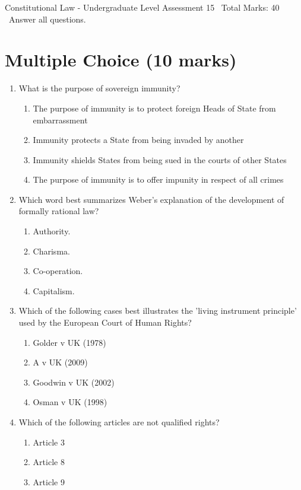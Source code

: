 \documentclass[12pt]{article}
\begin{document}
\begin{center}
Constitutional Law - Undergraduate Level Assessment 15 \
Total Marks: 40 \
Answer all questions.
\end{center}

\section*{Multiple Choice (10 marks)}
\begin{enumerate}[label=\arabic*.]
\item What is the purpose of sovereign immunity?
\begin{enumerate}[label=(\alph*)]
    \item The purpose of immunity is to protect foreign Heads of State from embarrassment
    \item Immunity protects a State from being invaded by another
    \item Immunity shields States from being sued in the courts of other States
    \item The purpose of immunity is to offer impunity in respect of all crimes
\end{enumerate}
\item Which word best summarizes Weber's explanation of the development of formally rational law?
\begin{enumerate}[label=(\alph*)]
    \item Authority.
    \item Charisma.
    \item Co-operation.
    \item Capitalism.
\end{enumerate}
\item Which of the following cases best illustrates the 'living instrument principle' used by the European Court of Human Rights?
\begin{enumerate}[label=(\alph*)]
    \item Golder v UK (1978)
    \item A v UK (2009)
    \item Goodwin v UK (2002)
    \item Osman v UK (1998)
\end{enumerate}
\item Which of the following articles are not qualified rights?
\begin{enumerate}[label=(\alph*)]
    \item Article 3
    \item Article 8
    \item Article 9

\end{enumerate}
\end{enumerate}
\end{document}
